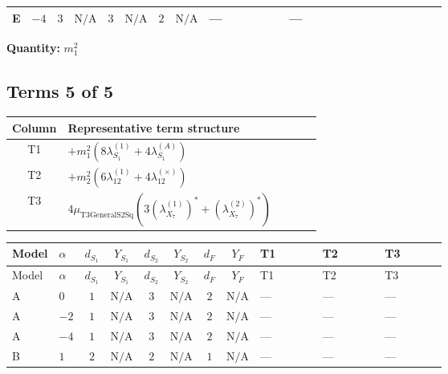 \documentclass[8pt]{article}
\begin{document}
\begin{landscape}
\begin{longtable}{@{}llcccccc >{\raggedright\arraybackslash}p{0.21\linewidth} >{\raggedright\arraybackslash}p{0.21\linewidth} >{\raggedright\arraybackslash}p{0.21\linewidth}@{}}
\midrule
E & $-4$ & $3$ & $\text{N/A}$ & $3$ & $\text{N/A}$ & $2$ & $\text{N/A}$ & --- & --- & \scriptsize\adjustbox{max width=\linewidth}{$\begin{gathered} -12 {g_2}^2 {m_1^2}\end{gathered}$} \\
\midrule
\bottomrule
\end{longtable}
\clearpage
\noindent\textbf{Quantity: }$m_1^2$\par\smallskip
\subsection*{Terms 5 of 5}
\begin{center}
\begin{tabular}{@{}c >{\raggedright\arraybackslash}p{0.82\linewidth}@{}}
\toprule
Column & Representative term structure \\
\midrule
T1 & \(\displaystyle +{m_1^2} (8 {\lambda_{S_1}^{(1)}}+4 {\lambda_{S_1}^{(A)}})\) \\
\midrule
T2 & \(\displaystyle +{m_2^2} (6 {\lambda_{12}^{(1)}}+4 {\lambda_{12}^{(\times)}})\) \\
\midrule
T3 & \(\displaystyle 4 {\mu_{\mathrm{T3GeneralS2Sq}}} (3 \left({\lambda_{X_{7}}^{(1)}}\right)^{*}+\left({\lambda_{X_{7}}^{(2)}}\right)^{*})\) \\
\midrule
\bottomrule
\end{tabular}
\end{center}
\smallskip
\tiny
\begin{longtable}{@{}llcccccc >{\raggedright\arraybackslash}p{0.21\linewidth} >{\raggedright\arraybackslash}p{0.21\linewidth} >{\raggedright\arraybackslash}p{0.21\linewidth}@{}}
\toprule
Model & $\alpha$ & $d_{S_1}$ & $Y_{S_1}$ & $d_{S_2}$ & $Y_{S_2}$ & $d_F$ & $Y_F$ & T1 & T2 & T3 \\
\midrule
\endfirsthead
\toprule
Model & $\alpha$ & $d_{S_1}$ & $Y_{S_1}$ & $d_{S_2}$ & $Y_{S_2}$ & $d_F$ & $Y_F$ & T1 & T2 & T3 \\
\midrule
\endhead
A & $0$ & $1$ & $\text{N/A}$ & $3$ & $\text{N/A}$ & $2$ & $\text{N/A}$ & --- & --- & --- \\
\midrule
A & $-2$ & $1$ & $\text{N/A}$ & $3$ & $\text{N/A}$ & $2$ & $\text{N/A}$ & --- & --- & --- \\
\midrule
A & $-4$ & $1$ & $\text{N/A}$ & $3$ & $\text{N/A}$ & $2$ & $\text{N/A}$ & --- & --- & --- \\
\midrule
B & $1$ & $2$ & $\text{N/A}$ & $2$ & $\text{N/A}$ & $1$ & $\text{N/A}$ & --- & --- & --- \\

\end{longtable}
\end{landscape}
\end{document}
